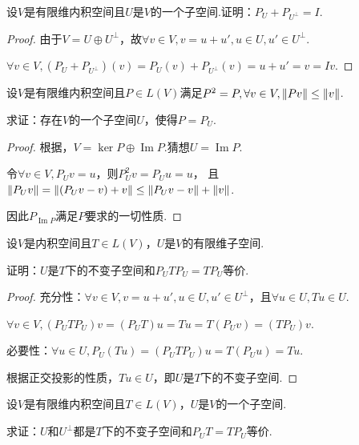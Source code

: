 \begin{problem}[5]\label{6.C.5}
    设\(V\)是有限维内积空间且\(U\)是\(V\)的一个子空间.证明：\(P_U+P_{U^\bot}=I\).
\end{problem}

\begin{proof}
    由于\(V=U \oplus U^\bot\)，故\(\forall v \in V,v=u+u',u \in U,u' \in U^\bot\).

    \(\forall v \in V,(P_U+P_{U^\bot})(v)=P_U(v)+P_{U^\bot}(v)=u+u'=v=Iv\).
\end{proof}

\begin{problem}[8]\label{6.C.8}
    设\(V\)是有限维内积空间且\(P \in L(V)\)满足\(P^2=P,\forall v \in V,\norm*{Pv} \leq \norm*{v}\).

    求证：存在\(V\)的一个子空间\(U\)，使得\(P=P_U\).
\end{problem}

\begin{proof}
    根据，\(V= \ker P \oplus \operatorname{Im} P\).猜想\(U=\operatorname{Im} P\).

    令\(\forall v \in V,P_U v=u\)，则\(P_U^2 v=P_U u=u\)，
    且\(\norm*{P_U v}=\norm*{(P_U v-v)+v} \leq \norm*{P_U v-v}+\norm*{v}\).
    
    因此\(P_{\operatorname{Im} P}\)满足\(P\)要求的一切性质.
\end{proof}

\begin{problem}[9]\label{6.C.9}
    设\(V\)是内积空间且\(T \in L(V)\)，\(U\)是\(V\)的有限维子空间.

    证明：\(U\)是\(T\)下的不变子空间和\(P_U T P_U=T P_U\)等价.
\end{problem}

\begin{proof}
    充分性：\(\forall v \in V,v=u+u',u \in U,u' \in U^\bot\)，且\(\forall u \in U,Tu \in U\).

    \(\forall v \in V,(P_U T P_U)v=(P_U T)u=Tu=T(P_U v)=(T P_U)v\).
    
    必要性：\(\forall u \in U,P_U(Tu)=(P_U T P_U)u=T(P_U u)=Tu\).
    
    根据正交投影的性质，\(Tu \in U\)，即\(U\)是\(T\)下的不变子空间.
\end{proof}

\newpage

\begin{problem}[10]\label{6.C.10}
    设\(V\)是有限维内积空间且\(T \in L(V)\)，\(U\)是\(V\)的一个子空间.

    求证：\(U\)和\(U^\bot\)都是\(T\)下的不变子空间和\(P_U T=T P_U\)等价.
\end{problem}

